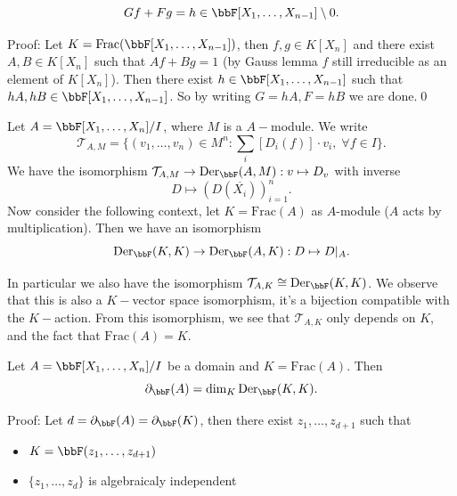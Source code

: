 \begin{itemize}
\begin{corollary}
    \begin{equation}
        Gf + Fg = h\in \bbF[X_1,\dots,X_{n-1}]\setminus0.
    \end{equation}
  \end{corollary}
  Proof: Let $K=\text{Frac}(\bbF[X_1,\dots,X_{n-1}])$, then $f,g\in K[X_n]$ and there exist 
  $A,B\in K[X_n]$ such that $Af + Bg = 1$ (by Gauss lemma $f$ still irreducible as an element of 
  $K[X_n]$). Then there exist $h\in \bbF[X_1,\dots,X_{n-1}]$ such that 
  $hA, hB\in \bbF[X_1,\dots,X_{n-1}]$. So by writing $G=hA, F =hB$ we are done.\qed
  \begin{notation}
    Let $A=\bbF[X_1,\dots,X_n]/I$, where $M$ is a $A-$module. We write 
    \begin{equation}
        \mathcal{T}_{A,M}=\{(v_1,\dots,v_n)\in M^n:\sum_i[D_i(f)]\cdot v_i,\;\forall f\in I\}.
    \end{equation}
    We have the isomorphism $\mathcal{T}_{A,M}\to \text{Der}_{\bbF}(A,M): v\mapsto D_v$ with inverse 
    \begin{equation}
        D\mapsto (D(\overline{X_i}))_{i=1}^n.
    \end{equation}
    Now consider the following context, let 
    $K=\text{Frac}(A)$ as $A$-module ($A$ acts by multiplication). Then we have an isomorphism
    \begin{equation}
        \text{Der}_{\bbF}(K,K)\to \text{Der}_{\bbF}(A,K):D\mapsto D|_A.
    \end{equation}
  \end{notation}
  In particular we also have the isomorphism $\mathcal{T}_{A,K} \cong  \text{Der}_{\bbF}(K,K)$. We observe that 
  this is also a $K-$vector space isomorphism, it's a bijection compatible with the $K-$action. From this isomorphism, 
  we see that $\mathcal{T}_{A,K}$ only depends on $K$, and the fact that $\text{Frac}(A)=K$.
  \begin{theorem}
    Let $A=\bbF[X_1,\dots,X_n]/I$ be a domain and $K=\text{Frac}(A)$. Then 
    \begin{equation}
        \partial_{\bbF}(A) = \dim_{K}\text{Der}_{\bbF}(K,K).
    \end{equation} 
  \end{theorem}
  Proof: Let $d=\partial_{\bbF}(A)=\partial_{\bbF}(K)$, then there exist 
  $z_1,\dots, z_{d+1}$ such that 
  \begin{itemize}
    \item $K=\bbF(z_1,\dots, z_{d+1})$
    \item $\{z_1,\dots,z_d\}$ is algebraicaly independent

\end{itemize}
\end{itemize}

